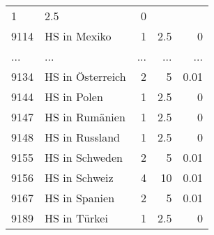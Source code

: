 \begin{longtable}{lXrrr}
          \num{1} &
          \num[round-mode=places,round-precision=2]{2.5} &
          \num[round-mode=places,round-precision=2]{0} \\
        9114 & \multicolumn{1}{X}{HS in Mexiko} & %
          \num{1} &
          \num[round-mode=places,round-precision=2]{2.5} &
          \num[round-mode=places,round-precision=2]{0} \\
       ... & ... & ... & ... & ... \\
        9134 & \multicolumn{1}{X}{HS in Österreich} & %
          \num{2} &
          \num[round-mode=places,round-precision=2]{5} &
          \num[round-mode=places,round-precision=2]{0.01} \\

        9144 & \multicolumn{1}{X}{HS in Polen} & %
          \num{1} &
          \num[round-mode=places,round-precision=2]{2.5} &
          \num[round-mode=places,round-precision=2]{0} \\

        9147 & \multicolumn{1}{X}{HS in Rumänien} & %
          \num{1} &
          \num[round-mode=places,round-precision=2]{2.5} &
          \num[round-mode=places,round-precision=2]{0} \\

        9148 & \multicolumn{1}{X}{HS in Russland} & %
          \num{1} &
          \num[round-mode=places,round-precision=2]{2.5} &
          \num[round-mode=places,round-precision=2]{0} \\

        9155 & \multicolumn{1}{X}{HS in Schweden} & %
          \num{2} &
          \num[round-mode=places,round-precision=2]{5} &
          \num[round-mode=places,round-precision=2]{0.01} \\

        9156 & \multicolumn{1}{X}{HS in Schweiz} & %
          \num{4} &
          \num[round-mode=places,round-precision=2]{10} &
          \num[round-mode=places,round-precision=2]{0.01} \\

        9167 & \multicolumn{1}{X}{HS in Spanien} & %
          \num{2} &
          \num[round-mode=places,round-precision=2]{5} &
          \num[round-mode=places,round-precision=2]{0.01} \\

        9189 & \multicolumn{1}{X}{HS in Türkei} & %
          \num{1} &
          \num[round-mode=places,round-precision=2]{2.5} &
          \num[round-mode=places,round-precision=2]{0} \\


\end{longtable}
